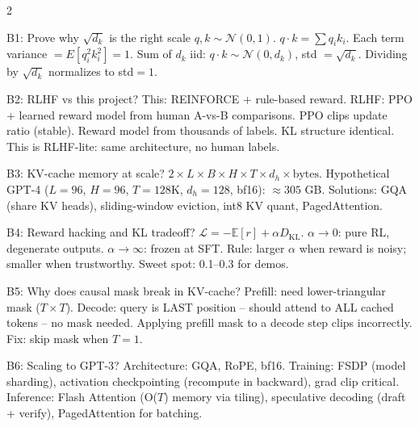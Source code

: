 \documentclass[10pt,a4paper]{article}
\begin{document}
\begin{multicols}{2}
\footnotesize

\begin{bonusbox}{B1: Prove why $\sqrt{d_k}$ is the right scale}
$q,k\!\sim\!\mathcal{N}(0,1)$. $q{\cdot}k = \sum q_i k_i$.
Each term variance $= E[q_i^2 k_i^2] = 1$.
Sum of $d_k$ iid: $q{\cdot}k \sim \mathcal{N}(0,d_k)$, std $= \sqrt{d_k}$.
Dividing by $\sqrt{d_k}$ normalizes to std$=1$.
\end{bonusbox}

\begin{bonusbox}{B2: RLHF vs this project?}
This: REINFORCE + rule-based reward.
RLHF: PPO + learned reward model from human A-vs-B comparisons.
PPO clips update ratio (stable). Reward model from thousands of labels.
KL structure identical. This is RLHF-lite: same architecture, no human labels.
\end{bonusbox}

\begin{bonusbox}{B3: KV-cache memory at scale?}
$2\!\times\!L\!\times\!B\!\times\!H\!\times\!T\!\times\!d_h\!\times\!\text{bytes}$.
Hypothetical GPT-4 ($L{=}96$, $H{=}96$, $T{=}128$K, $d_h{=}128$, bf16):
$\approx 305$ GB. Solutions: GQA (share KV heads), sliding-window eviction, int8 KV quant, PagedAttention.
\end{bonusbox}

\begin{bonusbox}{B4: Reward hacking and KL tradeoff?}
$\mathcal{L}=-\mathbb{E}[r]+\alpha D_\text{KL}$.
$\alpha{\to}0$: pure RL, degenerate outputs.
$\alpha{\to}\infty$: frozen at SFT.
Rule: larger $\alpha$ when reward is noisy; smaller when trustworthy.
Sweet spot: 0.1--0.3 for demos.
\end{bonusbox}

\begin{bonusbox}{B5: Why does causal mask break in KV-cache?}
Prefill: need lower-triangular mask ($T{\times}T$).
Decode: query is LAST position -- should attend to ALL cached tokens -- no mask needed.
Applying prefill mask to a decode step clips incorrectly.
Fix: skip mask when $T=1$.
\end{bonusbox}

\begin{bonusbox}{B6: Scaling to GPT-3?}
Architecture: GQA, RoPE, bf16.
Training: FSDP (model sharding), activation checkpointing (recompute in backward), grad clip critical.
Inference: Flash Attention (O($T$) memory via tiling), speculative decoding (draft + verify), PagedAttention for batching.
\end{bonusbox}


\end{multicols}
\end{document}
